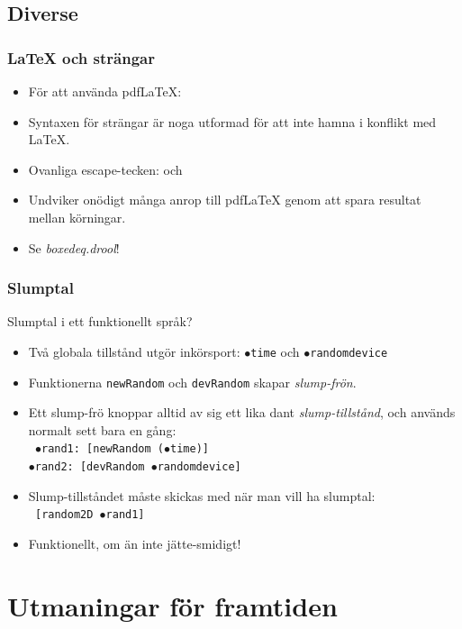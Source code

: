\documentclass[noamsthm,handout]{beamer}
\begin{document}
\subsection{Diverse}
\begin{frame}\frametitle{\LaTeX{} och strängar}
  \begin{itemize}
  \item För att använda pdf\LaTeX{}:\\
  \item Syntaxen för strängar är noga utformad för att inte hamna i konflikt med \LaTeX{}.
  \item Ovanliga escape-tecken: \texttt{\cent} och \texttt{\currency}
  \item Undviker onödigt många anrop till pdf\LaTeX{} genom att spara resultat mellan körningar.
  \item Se \emph{boxedeq.drool}!
  \end{itemize}
\end{frame}
\begin{frame}\frametitle{Slumptal}
  Slumptal i ett funktionellt språk?
  \begin{itemize}
  \item Två globala tillstånd utgör inkörsport: \texttt{$\bullet$time} och \texttt{$\bullet$randomdevice}
  \item Funktionerna \texttt{newRandom} och \texttt{devRandom} skapar \emph{slump-frön}.
  \item Ett slump-frö knoppar alltid av sig ett lika dant \emph{slump-tillstånd}, och används normalt sett bara en gång:\\
    \texttt{%
      $\bullet$rand1: [newRandom ($\bullet$time)]\\
      $\bullet$rand2: [devRandom $\bullet$randomdevice]
    }
  \item Slump-tillståndet måste skickas med när man vill ha slumptal:\\
    \texttt{%
      [random2D $\bullet$rand1]
    }
  \item Funktionellt, om än inte jätte-smidigt!
  \end{itemize}
\end{frame}

\section{Utmaningar för framtiden}
\end{document}
